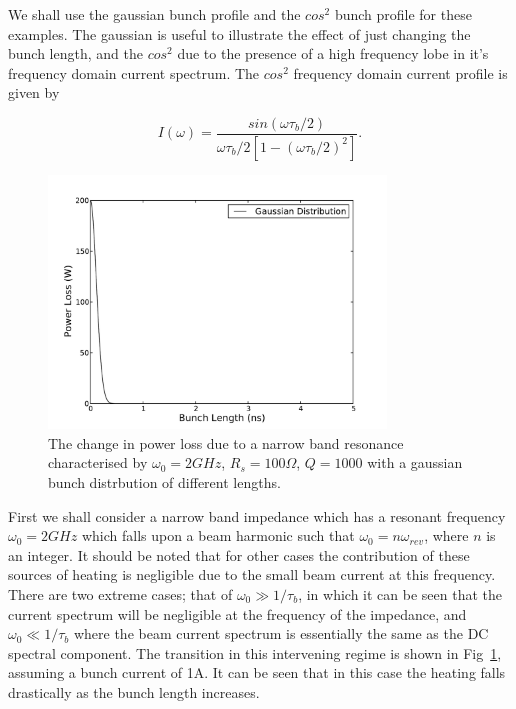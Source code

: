 We shall use the gaussian bunch profile and the $cos^{2}$ bunch profile for these examples. The gaussian is useful to illustrate the effect of just changing the bunch length, and the $cos^{2}$ due to the presence of a high frequency lobe in it's frequency domain current spectrum. The $cos^{2}$ frequency domain current profile is given by

\begin{equation}
I \left( \omega \right) = \frac{sin \left( \omega \tau_{b}/2 \right)}{ \omega \tau_{b}/2 \left[ 1 - \left(  \omega \tau_{b}/2 \right)^{2}  \right]}.
\end{equation}

\begin{figure}
\begin{center}
\includegraphics[width=0.8\textwidth]{Wakefields_and_Impedances/figures/heating_narrowband_gauss_bunch_length.pdf}
\end{center}
\caption{The change in power loss due to a narrow band resonance characterised by $\omega_{0} = 2GHz$, $R_{s} = 100\Omega$, $Q = 1000$ with a gaussian bunch distrbution of different lengths.}
\label{fig:bunch_length_heat_narrow}
\end{figure}

First we shall consider a narrow band impedance which has a resonant frequency $\omega_{0} =2GHz$ which falls upon a beam harmonic such that $\omega_{0}=n\omega_{rev}$, where $n$ is an integer. It should be noted that for other cases the contribution of these sources of heating is negligible due to the small beam current at this frequency. There are two extreme cases; that of  $\omega_{0} \gg 1/\tau_{b}$, in which it can be seen that the current spectrum will be negligible at the frequency of the impedance, and $\omega_{0} \ll 1/\tau_{b}$ where the beam current spectrum is essentially the same as the DC spectral component. The transition in this intervening regime is shown in Fig~\ref{fig:bunch_length_heat_narrow}, assuming a bunch current of 1A. It can be seen that in this case the heating falls drastically as the bunch length increases.

